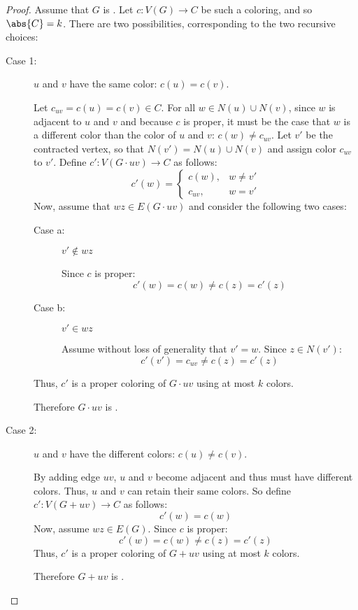 \begin{proof}
  Assume that \(G\) is .  Let \(c:V(G)\to C\) be such a coloring, and so \(\abs{C}=k\).  There are two
  possibilities, corresponding to the two recursive choices:
  \begin{description}
  \item [Case 1:] \(u\) and \(v\) have the same color: \(c(u)=c(v)\).

    Let \(c_{uv}=c(u)=c(v)\in C\).  For all \(w\in N(u)\cup N(v)\), since \(w\) is adjacent to \(u\) and \(v\) and
    because \(c\) is proper, it must be the case that \(w\) is a different color than the color of \(u\) and \(v\):
    \(c(w)\ne c_{uv}\).  Let \(v'\) be the contracted vertex, so that \(N(v')=N(u)\cup N(v)\) and assign color
    \(c_{uv}\) to \(v'\).  Define \(c':V(G\cdot uv)\to C\) as follows:
    \[c'(w)=\begin{cases}
    c(w), & w\ne v' \\
    c_{uv}, & w=v'
    \end{cases}\]
    Now, assume that \(wz\in E(G\cdot uv)\) and consider the following two cases:
    \begin{description}
    \item[Case a:] \(v'\notin wz\)

      Since \(c\) is proper:
      \[c'(w)=c(w)\ne c(z)=c'(z)\]

    \item[Case b:] \(v'\in wz\)

      Assume without loss of generality that \(v'=w\).  Since \(z\in N(v')\):
      \[c'(v')=c_{uv}\ne c(z)=c'(z)\]
    \end{description}

    Thus, \(c'\) is a proper coloring of \(G\cdot uv\) using at most \(k\) colors.
      
    Therefore \(G\cdot uv\) is .

  \item [Case 2:] \(u\) and \(v\) have the different colors: \(c(u)\ne c(v)\).

    By adding edge \(uv\), \(u\) and \(v\) become adjacent and thus must have different colors.  Thus, \(u\)
    and \(v\) can retain their same colors.  So define \(c':V(G+uv)\to C\) as follows:
    \[c'(w)=c(w)\]
    Now, assume \(wz\in E(G)\).  Since \(c\) is proper:
    \[c'(w)=c(w)\ne c(z)=c'(z)\]
    Thus, \(c'\) is a proper coloring of \(G+uv\) using at most \(k\) colors.

    Therefore \(G+uv\) is .
  \end{description}


\end{proof}
